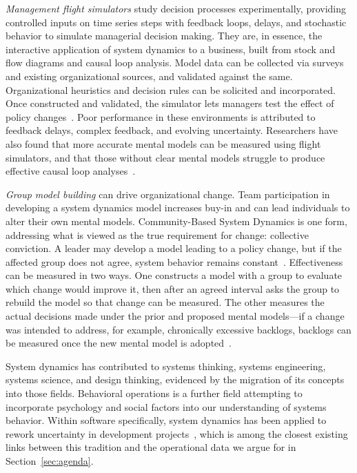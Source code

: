 \documentclass[11pt,a4paper]{article}
\begin{document}
\emph{Management flight simulators} study decision processes experimentally,
providing controlled inputs on time series steps with feedback loops, delays,
and stochastic behavior to simulate managerial decision making. They are, in
essence, the interactive application of system dynamics to a business, built
from stock and flow diagrams and causal loop analysis. Model data can be
collected via surveys and existing organizational sources, and validated against
the same. Organizational heuristics and decision rules can be solicited and
incorporated. Once constructed and validated, the simulator lets managers test
the effect of policy changes~\citep{papageorgiou2008}. Poor performance in these
environments is attributed to feedback delays, complex feedback, and evolving
uncertainty. Researchers have also found that more accurate mental models can be
measured using flight simulators, and that those without clear mental models
struggle to produce effective causal loop analyses~\citep{kunc2016}.

\emph{Group model building} can drive organizational change. Team participation
in developing a system dynamics model increases buy-in and can lead individuals
to alter their own mental models. Community-Based System Dynamics is one form,
addressing what is viewed as the true requirement for change: collective
conviction. A leader may develop a model leading to a policy change, but if the
affected group does not agree, system behavior remains
constant~\citep{hovmand2013}. Effectiveness can be measured in two ways. One
constructs a model with a group to evaluate which change would improve it, then
after an agreed interval asks the group to rebuild the model so that change can
be measured. The other measures the actual decisions made under the prior and
proposed mental models---if a change was intended to address, for example,
chronically excessive backlogs, backlogs can be measured once the new mental
model is adopted~\citep{kunc2016}.

System dynamics has contributed to systems thinking, systems engineering,
systems science, and design thinking, evidenced by the migration of its concepts
into those fields. Behavioral operations is a further field attempting to
incorporate psychology and social factors into our understanding of systems
behavior. Within software specifically, system dynamics has been applied to
rework uncertainty in development projects~\citep{khatun2023}, which is among
the closest existing links between this tradition and the operational data we
argue for in Section~\ref{sec:agenda}.
\end{document}
